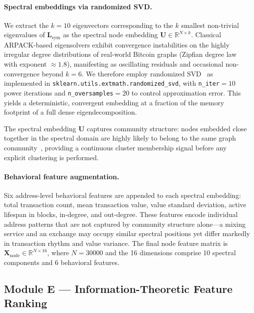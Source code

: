 \documentclass[journal]{IEEEtran}
\begin{document}
\paragraph{Spectral embeddings via randomized SVD.}
We extract the $k = 10$ eigenvectors corresponding to the $k$ smallest
non-trivial eigenvalues of $\mathbf{L}_{\mathrm{sym}}$ as the spectral node
embedding $\mathbf{U} \in \mathbb{R}^{N \times k}$.
Classical ARPACK-based eigensolvers exhibit convergence instabilities on the
highly irregular degree distributions of real-world Bitcoin graphs (Zipfian
degree law with exponent $\approx 1.8$), manifesting as oscillating residuals
and occasional non-convergence beyond $k = 6$.
We therefore employ randomized SVD~\cite{Halko2011} as implemented in
\texttt{sklearn.utils.extmath.randomized\_svd}, with
\texttt{n\_iter}$= 10$ power iterations and
\texttt{n\_oversamples}$= 20$ to control approximation error.
This yields a deterministic, convergent embedding at a fraction of the memory
footprint of a full dense eigendecomposition.

The spectral embedding $\mathbf{U}$ captures community structure: nodes
embedded close together in the spectral domain are highly likely to belong
to the same graph community~\cite{VonLuxburg2007}, providing a
continuous cluster membership signal before any explicit clustering is
performed.

\paragraph{Behavioral feature augmentation.}
Six address-level behavioral features are appended to each spectral embedding:
total transaction count, mean transaction value, value standard deviation,
active lifespan in blocks, in-degree, and out-degree.
These features encode individual address patterns that are not captured by
community structure alone—a mixing service and an exchange may occupy similar
spectral positions yet differ markedly in transaction rhythm and value
variance.
The final node feature matrix is
$\mathbf{X}_{\mathrm{node}} \in \mathbb{R}^{N \times 16}$,
where $N = \num{30000}$ and the 16 dimensions comprise 10 spectral
components and 6 behavioral features.

\subsection{Module E — Information-Theoretic Feature Ranking}
\label{sec:module_e}
\end{document}
